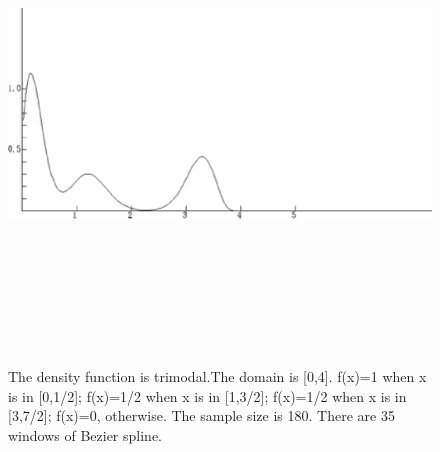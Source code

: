 \documentclass [18pt]{article}
\begin{document}
\begin{figure}[htbp]
\centerline{\includegraphics[width=7.17in,height=5.17in]{083.eps}}
\caption{The density function is trimodal.The domain is  [0,4].
f(x)=1 when x is in [0,1/2]; f(x)=1/2 when x is in [1,3/2];
f(x)=1/2 when x is in [3,7/2]; f(x)=0, otherwise. The sample size
is 180. There are 35 windows of Bezier spline. } \label{fig3}
\end{figure}
\end{document}
